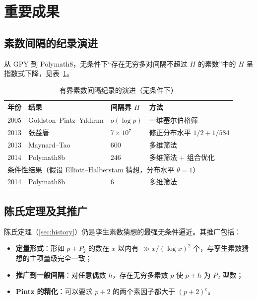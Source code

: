 \section{重要成果}\label{sec:results}

\subsection{素数间隔的纪录演进}

从 GPY 到 Polymath8，无条件下“存在无穷多对间隔不超过 $H$ 的素数”中的 $H$ 呈指数式下降，见表~\ref{tab:gaps}。

\begin{table}[htbp]
    \centering
    \caption{有界素数间隔纪录的演进（无条件下）}
    \label{tab:gaps}
    \begin{tabular}{llll}
        \toprule
        年份 & 结果 & 间隔界 $H$ & 方法 \\
        \midrule
        2005 & Goldston--Pintz--Yıldırım & $o(\log p)$ & 一维塞尔伯格筛 \\
        2013 & 张益唐 & $7 \times 10^7$ & 修正分布水平 $1/2 + 1/584$ \\
        2013 & Maynard--Tao & $600$ & 多维筛法 \\
        2014 & Polymath8b & $246$ & 多维筛法 + 组合优化 \\
        \midrule
        \multicolumn{4}{l}{条件性结果（假设 Elliott--Halberstam 猜想，分布水平 $\theta = 1$）} \\
        2014 & Polymath8b & $6$ & 多维筛法 \\
        \bottomrule
    \end{tabular}
\end{table}

\subsection{陈氏定理及其推广}

陈氏定理（\cref{sec:history}）仍是孪生素数猜想的最强无条件逼近。其推广包括：

\begin{itemize}
    \item \textbf{定量形式}：形如 $p + P_2$ 的数在 $x$ 以内有 $\gg x/(\log x)^2$ 个，与孪生素数猜想的主项量级完全一致；
    \item \textbf{推广到一般间隔}：对任意偶数 $h$，存在无穷多素数 $p$ 使 $p + h$ 为 $P_2$ 型数；
    \item \textbf{Pintz 的精化}：可以要求 $p+2$ 的两个素因子都大于 $(p+2)^{c}$。
\end{itemize}

